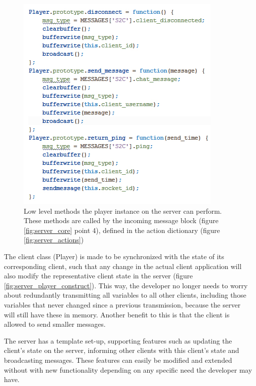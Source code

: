\documentclass[bsc,frontabs,twoside,singlespacing,parskip,deptreport]{infthesis}     %
\begin{document}
\begin{figure}[H]
\includegraphics[scale=0.75]{images/server_player_functions.jpg}
\caption{Low level methods the player instance on the server can perform. These methods are called by the incoming message block (figure \ref{fig:server_core} point 4), defined in the action dictionary (figure \ref{fig:server_actions})}
\label{fig:server_player_functions}
\end{figure}

The client class (Player) is made to be synchronized with the state of its corresponding client, such that any change in the actual client application will also modify the representative client state in the server (figure \ref{fig:server_player_construct}). This way, the developer no longer needs to worry about redundantly transmitting all variables to all other clients, including those variables that never changed since a previous transmission, because the server will still have these in memory. Another benefit to this is that the client is allowed to send smaller messages.

The server has a template set-up, supporting features such as updating the client's state on the server, informing other clients with this client's state and broadcasting messages. These features can easily be modified and extended without with new functionality depending on any specific need the developer may have.
\end{document}

